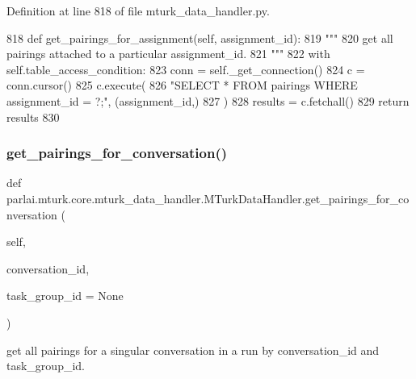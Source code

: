 Definition at line 818 of file mturk\+\_\+data\+\_\+handler.\+py.


\begin{DoxyCode}
818     \textcolor{keyword}{def }get\_pairings\_for\_assignment(self, assignment\_id):
819         \textcolor{stringliteral}{"""}
820 \textcolor{stringliteral}{        get all pairings attached to a particular assignment\_id.}
821 \textcolor{stringliteral}{        """}
822         with self.table\_access\_condition:
823             conn = self.\_get\_connection()
824             c = conn.cursor()
825             c.execute(
826                 \textcolor{stringliteral}{"SELECT * FROM pairings WHERE assignment\_id = ?;"}, (assignment\_id,)
827             )
828             results = c.fetchall()
829             \textcolor{keywordflow}{return} results
830 
\end{DoxyCode}
\mbox{\label{classparlai_1_1mturk_1_1core_1_1mturk__data__handler_1_1MTurkDataHandler_a7456a75caea9fb681067dee584567f27}} 
\subsubsection{\texorpdfstring{get\+\_\+pairings\+\_\+for\+\_\+conversation()}{get\_pairings\_for\_conversation()}}
{\footnotesize\ttfamily def parlai.\+mturk.\+core.\+mturk\+\_\+data\+\_\+handler.\+M\+Turk\+Data\+Handler.\+get\+\_\+pairings\+\_\+for\+\_\+conversation (\begin{DoxyParamCaption}\item[{}]{self,  }\item[{}]{conversation\+\_\+id,  }\item[{}]{task\+\_\+group\+\_\+id = {\ttfamily None} }\end{DoxyParamCaption})}

\begin{DoxyVerb}get all pairings for a singular conversation in a run by conversation_id and
task_group_id.
\end{DoxyVerb}
 

